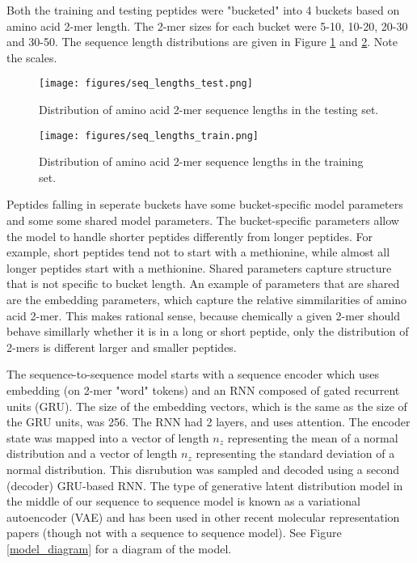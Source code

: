\documentclass[preprint,12pt]{elsarticle}
\begin{document}
Both the training and testing peptides were "bucketed" into 4 buckets based on amino acid 2-mer length. The 2-mer sizes for each bucket were 5-10, 10-20, 20-30 and 30-50. The sequence length distributions are given in Figure \ref{fig:distribution_data_testing} and \ref{fig:distribution_data_training}. Note the scales.

\begin{figure}
  \centering
  \texttt{[image: figures/seq\_lengths\_test.png]}
  \caption{Distribution of amino acid 2-mer sequence lengths in the testing set.}
  \label{fig:distribution_data_testing}
\end{figure}

\begin{figure}
  \centering
  \texttt{[image: figures/seq\_lengths\_train.png]}
  \caption{Distribution of amino acid 2-mer sequence lengths in the training set.}
  \label{fig:distribution_data_training}
\end{figure}

Peptides falling in seperate buckets have some bucket-specific model parameters and some some shared model parameters. The bucket-specific parameters allow the model to handle shorter peptides differently from longer peptides. For example, short peptides tend not to start with a methionine, while almost all longer peptides start with a methionine. Shared parameters capture structure that is not specific to bucket length. An example of parameters that are shared are the embedding parameters, which capture the relative simmilarities of amino acid 2-mer. This makes rational sense, because chemically a given 2-mer should behave simillarly whether it is in a long or short peptide, only the distribution of 2-mers is different larger and smaller peptides.

The sequence-to-sequence model starts with a sequence encoder which uses embedding (on 2-mer "word" tokens) and an RNN composed of gated recurrent units (GRU)\cite{chung2014empirical}. The size of the embedding vectors, which is the same as the size of the GRU units, was 256. The RNN had 2 layers, and uses attention\cite{chorowski2014end}. The encoder state was mapped into a vector of length $n_z$ representing the mean of a normal distribution and a vector of length $n_z$ representing the standard deviation of a normal distribution. This disrubution was sampled and decoded using a second (decoder) GRU-based RNN. The type of generative latent distribution model in the middle of our sequence to sequence model is known as a variational autoencoder (VAE) and has been used in other recent molecular representation papers\cite{gomez2016automatic} (though not with a sequence to sequence model). See Figure \ref{model_diagram} for a diagram of the model.
\end{document}
